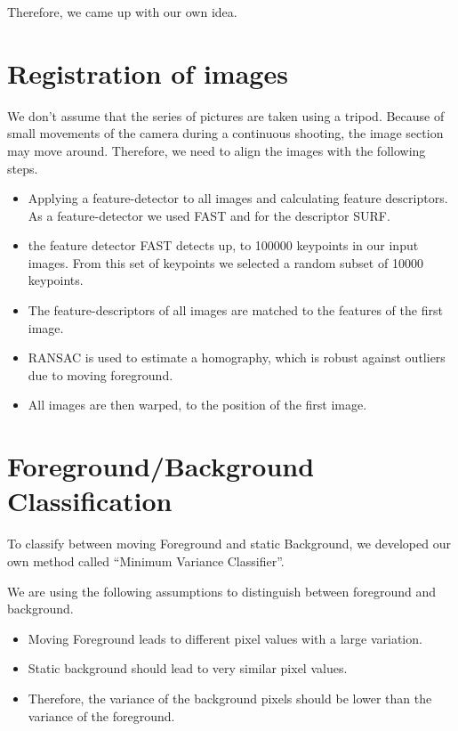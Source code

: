 Therefore, we came up with our own idea.

\section{Registration of images}

We don't assume that the series of pictures are taken using a tripod.
Because of small movements of the camera during a continuous shooting, the image section may move
around.
Therefore, we need to align the images with the following steps.

\begin{itemize}
 \item Applying a feature-detector to all images and calculating feature descriptors.
  As a feature-detector we used FAST and for the descriptor SURF.
 \item the feature detector FAST detects up, to 100000 keypoints in our input images.
 From this set of keypoints we selected a random subset of 10000 keypoints.
 \item The feature-descriptors of all images are matched to the features of the first image.
 \item RANSAC is used to estimate a homography, which is robust against outliers due to moving foreground.
 \item All images are then warped, to the position of the first image.
\end{itemize}



\section{Foreground/Background Classification}

To classify between moving Foreground and static Background, we developed our own method called
``Minimum Variance Classifier''.

We are using the following assumptions to distinguish between foreground and background.

\begin{itemize}
 \item Moving Foreground leads to different pixel values with a large variation.
 \item Static background should lead to very similar pixel values.
 \item Therefore, the variance of the background pixels should be lower than the variance of the foreground.
\end{itemize}
 
